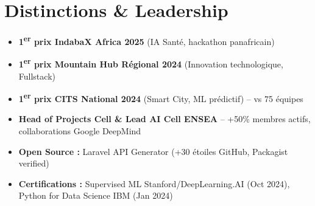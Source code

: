 \documentclass[a4paper,11pt]{article}
\begin{document}
\section{Distinctions \& Leadership}
\begin{itemize}[leftmargin=*, label=\tiny$\bullet$, nosep]
    \item \small{\textbf{1\textsuperscript{er} prix IndabaX Africa 2025} (IA Sant\'e, hackathon panafricain)}
    \item \small{\textbf{1\textsuperscript{er} prix Mountain Hub R\'egional 2024} (Innovation technologique, Fullstack)}
    \item \small{\textbf{1\textsuperscript{er} prix CITS National 2024} (Smart City, ML pr\'edictif) -- vs 75 \'equipes}
    \item \small{\textbf{Head of Projects Cell \& Lead AI Cell ENSEA} -- +50\% membres actifs, collaborations Google DeepMind}
    \item \small{\textbf{Open Source :} Laravel API Generator (+30 \'etoiles GitHub, Packagist verified)}
    \item \small{\textbf{Certifications :} Supervised ML Stanford/DeepLearning.AI (Oct 2024), Python for Data Science IBM (Jan 2024)}
\end{itemize}
\end{document}
